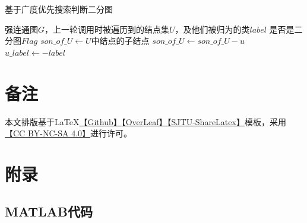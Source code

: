\documentclass[a4paper]{article}
\begin{document}
\begin{algorithm}  
    \caption{基于广度优先搜索判断二分图}  
    \begin{algorithmic}[1] %
        \Require  强连通图$G$，上一轮调用时被遍历到的结点集$U$，及他们被归为的类$label$
        \Ensure 是否是二分图$Flag$
            \State $son\_of\_U\gets U$中结点的子结点
            \State
            \State {}
            \Else {}
            \State $son\_of\_U\gets son\_of\_U - u$
            \Else {}
            \State $u\_label\gets -label$
            \EndIf
            \EndIf
            \EndForEach
            \State
            \State{}
            \Else {}
            \State {}
            \EndIf
        \EndFunction  
    \end{algorithmic}  
\end{algorithm}

\section*{备注}
本文排版基于\LaTeX{}\href{https://github.com/JamesZhutheThird/A-Simple-LaTeX-Template}{【Github】}\href{https://cn.overleaf.com/read/mxmypkyfrzpz}{【OverLeaf】}\href{https://latex.sjtu.edu.cn/read/ndjrkpksrfzn}{【SJTU-ShareLatex】}模板，采用\href{http://creativecommons.org/licenses/by-nc-sa/4.0/}{【CC BY-NC-SA 4.0】}进行许可。





\section*{附录}
\subsection*{MATLAB代码}

\end{document}
